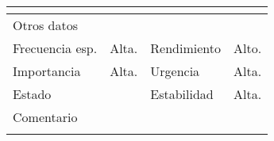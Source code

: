\documentclass{article}
\begin{document}
\begin{table}[h]
\begin{tabular}{|l|l|l|l|l|l|}
\multicolumn{1}{|p{1cm}}{} & \multicolumn{5}{|p{9cm}|}{}\\
\hline
\multicolumn{6}{|p{10cm}|}{Otros datos}\\
\hline
\multicolumn{1}{|p{2cm}|}{Frecuencia esp.} & \multicolumn{2}{p{3cm}}{Alta.} & \multicolumn{1}{|p{2cm}|}{Rendimiento} & \multicolumn{2}{p{3cm}|}{Alto.}\\
\hline
\multicolumn{1}{|p{2cm}|}{Importancia} & \multicolumn{2}{p{3cm}}{Alta.} & \multicolumn{1}{|p{2cm}|}{Urgencia} & \multicolumn{2}{p{3cm}|}{Alta.}\\
\hline
\multicolumn{1}{|p{2cm}|}{Estado} & \multicolumn{2}{p{3cm}}{} & \multicolumn{1}{|p{2cm}|}{Estabilidad} & \multicolumn{2}{p{3cm}|}{Alta.}\\
\hline
\multicolumn{6}{|p{10cm}|}{Comentario}\\
\hline
\multicolumn{6}{|p{10cm}|}{}\\
\hline
\end{tabular}
\end{table}
\end{document}

